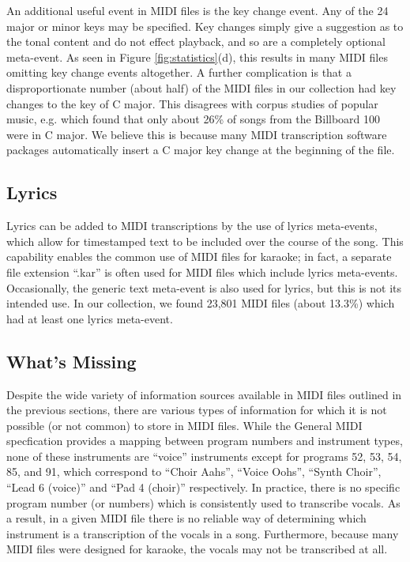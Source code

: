 \documentclass{article}
\begin{document}
An additional useful event in MIDI files is the key change event.
Any of the 24 major or minor keys may be specified.
Key changes simply give a suggestion as to the tonal content and do not effect playback, and so are a completely optional meta-event.
As seen in Figure \ref{fig:statistics}(d), this results in many MIDI files omitting key change events altogether.
A further complication is that a disproportionate number (about half) of the MIDI files in our collection had key changes to the key of C major.
This disagrees with corpus studies of popular music, e.g. \cite{carlton2012analyzed} which found that only about 26\% of songs from the Billboard 100 were in C major.
We believe this is because many MIDI transcription software packages automatically insert a C major key change at the beginning of the file.

\subsection{Lyrics}

Lyrics can be added to MIDI transcriptions by the use of lyrics meta-events, which allow for timestamped text to be included over the course of the song.
This capability enables the common use of MIDI files for karaoke; in fact, a separate file extension ``.kar'' is often used for MIDI files which include lyrics meta-events.
Occasionally, the generic text meta-event is also used for lyrics, but this is not its intended use.
In our collection, we found 23,801 MIDI files (about 13.3\%) which had at least one lyrics meta-event.

\subsection{What's Missing}
\label{sec:missing}

Despite the wide variety of information sources available in MIDI files outlined in the previous sections, there are various types of information for which it is not possible (or not common) to store in MIDI files.
While the General MIDI specfication provides a mapping between program numbers and instrument types, none of these instruments are ``voice'' instruments except for programs 52, 53, 54, 85, and 91, which correspond to ``Choir Aahs'', ``Voice Oohs'', ``Synth Choir'', ``Lead 6 (voice)'' and ``Pad 4 (choir)'' respectively.
In practice, there is no specific program number (or numbers) which is consistently used to transcribe vocals.
As a result, in a given MIDI file there is no reliable way of determining which instrument is a transcription of the vocals in a song.
Furthermore, because many MIDI files were designed for karaoke, the vocals may not be transcribed at all.
\end{document}

